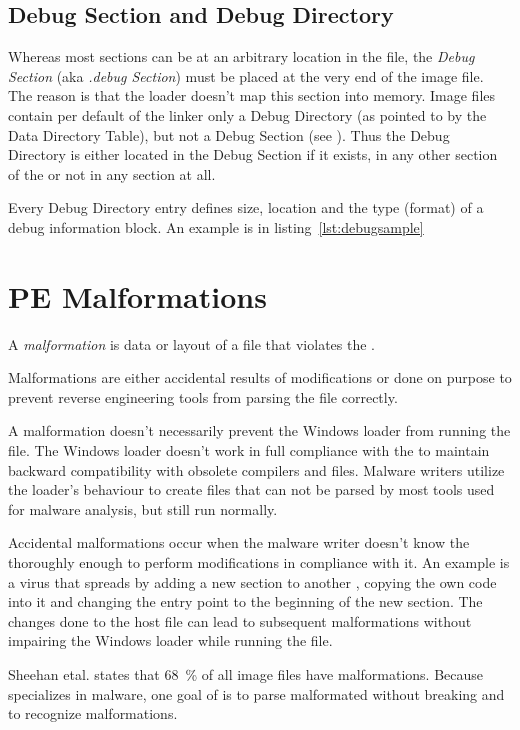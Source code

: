 \subsection*{Debug Section and Debug Directory}

Whereas most sections can be at an arbitrary location in the file, the \emph{Debug Section} (aka \emph{.debug Section}) must be placed at the very end of the image file. The reason is that the loader doesn't map this section into memory. Image files contain per default of the linker only a Debug Directory (as pointed to by the Data Directory Table), but not a Debug Section (see \cite[]{pespec}). Thus the Debug Directory is either located in the Debug Section if it exists, in any other section of the \PE{} or not in any section at all.

Every Debug Directory entry defines \ia{} size, location and the type (format) of a debug information block. An example is in listing~\ref{lst:debugsample}



\section{PE Malformations}

\begin{definition}[Malformation]
A \emph{malformation} is data or layout of a \PE{} file that violates the \PECOFF{}.
\end{definition} 

Malformations are either accidental results of \PE{} modifications or done on purpose to prevent reverse engineering tools from parsing the file correctly.

A malformation doesn't necessarily prevent the Windows loader from running the file. The Windows loader doesn't work in full compliance with the \PECOFF{} to maintain backward compatibility with obsolete compilers and files. Malware writers utilize the loader's behaviour to create \PE{} files that can not be parsed by most tools used for malware analysis, but still run normally. 

Accidental malformations occur when the malware writer doesn't know the \PECOFF{} thoroughly enough to perform modifications in compliance with it. An example is a virus that spreads by adding a new section to another \PE{}, copying the own code into it and changing the entry point to the beginning of the new section. The changes done to the host file can lead to subsequent malformations without impairing the Windows loader while running the file.

Sheehan et\thinspace{}al. states that 68~\% of all image files have malformations. \cite[slide 7]{sheehan07}
Because \portex{} specializes in \PE{} malware, one goal of \portex{} is to parse malformated  without breaking and to recognize malformations.
